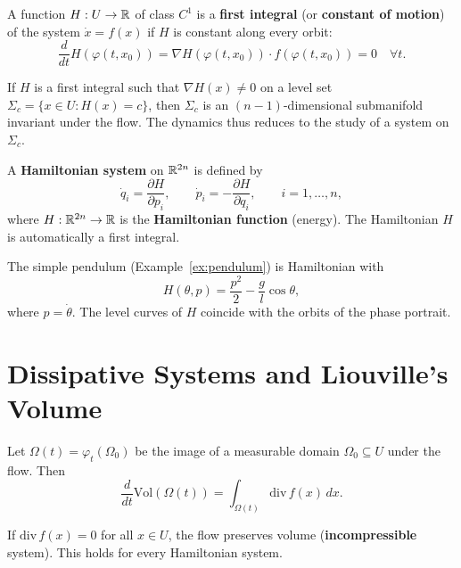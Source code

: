 \begin{definition}
A function $H : U \to \mathbb{R}$ of class $C^1$ is a \textbf{first integral}
(or \textbf{constant of motion}) of the system $\dot{x} = f(x)$ if $H$ is
constant along every orbit:
\[
    \frac{d}{dt} H(\varphi(t, x_0)) = \nabla H(\varphi(t, x_0)) \cdot
    f(\varphi(t, x_0)) = 0 \quad \forall t.
\]
\end{definition}

\begin{theorem}
If $H$ is a first integral such that $\nabla H(x) \neq 0$ on a level set
$\Sigma_c = \{x \in U : H(x) = c\}$, then $\Sigma_c$ is an $(n-1)$-dimensional
submanifold invariant under the flow. The dynamics thus reduces to the study
of a system on $\Sigma_c$.
\end{theorem}

\begin{definition}
A \textbf{Hamiltonian system} on $\mathbb{R}^{2n}$ is defined by
\[
    \dot{q}_i = \frac{\partial H}{\partial p_i}, \qquad
    \dot{p}_i = -\frac{\partial H}{\partial q_i}, \qquad i = 1, \ldots, n,
\]
where $H : \mathbb{R}^{2n} \to \mathbb{R}$ is the \textbf{Hamiltonian function} (energy).
The Hamiltonian $H$ is automatically a first integral.
\end{definition}

\begin{example}
The simple pendulum (Example~\ref{ex:pendulum}) is Hamiltonian with
\[
    H(\theta, p) = \frac{p^2}{2} - \frac{g}{l}\cos\theta,
\]
where $p = \dot{\theta}$. The level curves of $H$ coincide with the orbits
of the phase portrait.
\end{example}

\section{Dissipative Systems and Liouville's Volume}

\begin{theorem}
\label{thm:liouville}
Let $\Omega(t) = \varphi_t(\Omega_0)$ be the image of a measurable domain
$\Omega_0 \subseteq U$ under the flow. Then
\[
    \frac{d}{dt}\mathrm{Vol}(\Omega(t)) = \int_{\Omega(t)} \mathrm{div}\, f(x)\, dx.
\]
\end{theorem}

\begin{corollary}
If $\mathrm{div}\, f(x) = 0$ for all $x \in U$, the flow preserves volume
(\textbf{incompressible} system). This holds for every Hamiltonian system.
\end{corollary}

